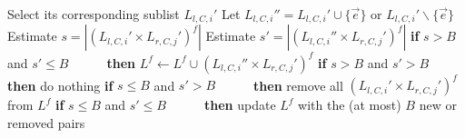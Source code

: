 \begin{algorithm}[htb]
\begin{algorithmic}[1]
 
\State Select its corresponding sublist $L_{l,C,i}'$
\State Let $L_{l,C,i}'' = L_{l,C,i}' \cup \{ \vec{e} \}$ or $L_{l,C,i}' \backslash \{\vec{e}\}$
\State Estimate $s = |(L_{l,C,i}' \times L_{r,C,j}')^f|$ 
\State Estimate $s' = |(L_{l,C,i}'' \times L_{r,C,j}')^f|$ 
\Statex {}
\State \textbf{if} $s > B$ and $s' \leq B$
\Statex {}
\State ~~ ~~ \textbf{then} $L^f \leftarrow L^f \cup (L_{l,C,i}'' \times L_{r,C,j}')^f$
\State \textbf{if} $s > B$ and $s' > B$
\State ~~ ~~ \textbf{then} do nothing
\State \textbf{if} $s \leq B$ and $s' > B$ 
\Statex {}
\State ~~ ~~ \textbf{then} remove all $(L_{l,C,i}' \times L_{r,C,j}')^f$ from $L^f$
\State \textbf{if} $s \leq B$ and $s' \leq B$
\State ~~ ~~ \textbf{then} update $L^f$ with the (at most) $B$ new or removed pairs
\EndFor
\EndFor

\end{algorithmic}
\end{algorithm}





